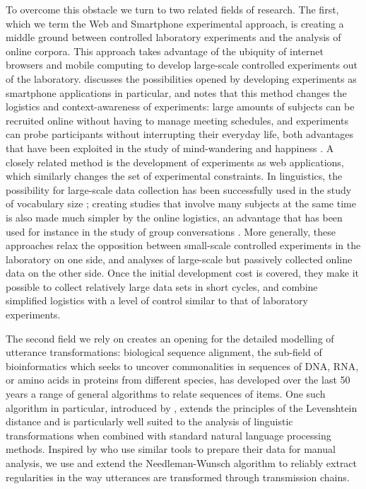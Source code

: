 To overcome this obstacle we turn to two related fields of research. The
first, which we term the Web and Smartphone experimental approach, is
creating a middle ground between controlled laboratory experiments and
the analysis of online corpora. This approach takes advantage of the
ubiquity of internet browsers and mobile computing to develop
large-scale controlled experiments out of the laboratory.
\textcite{miller_smartphone_2012} discusses the possibilities opened by
developing experiments as smartphone applications in particular, and
notes that this method changes the logistics and context-awareness of
experiments: large amounts of subjects can be recruited online without
having to manage meeting schedules, and experiments can probe
participants without interrupting their everyday life, both advantages
that have been exploited in the study of mind-wandering and happiness
\autocites{killingsworth_wandering_2010}{mackerron_happiness_2013}{bastian_language_2017}.
A closely related method is the development of experiments as web
applications, which similarly changes the set of experimental
constraints. In linguistics, the possibility for large-scale data
collection has been successfully used in the study of vocabulary size
\autocites{keuleers_word_2015}{brysbaert_how_2016}; creating studies
that involve many subjects at the same time is also made much simpler by
the online logistics, an advantage that has been used for instance in
the study of group conversations \autocite{niculae_conversational_2016}.
More generally, these approaches relax the opposition between
small-scale controlled experiments in the laboratory on one side, and
analyses of large-scale but passively collected online data on the other
side. Once the initial development cost is covered, they make it
possible to collect relatively large data sets in short cycles, and
combine simplified logistics with a level of control similar to that of
laboratory experiments.

The second field we rely on creates an opening for the detailed
modelling of utterance transformations: biological sequence alignment,
the sub-field of bioinformatics which seeks to uncover commonalities in
sequences of DNA, RNA, or amino acids in proteins from different
species, has developed over the last 50 years a range of general
algorithms to relate sequences of items. One such algorithm in
particular, introduced by \textcite{needleman_general_1970}, extends the
principles of the Levenshtein distance and is particularly well suited
to the analysis of linguistic transformations when combined with
standard natural language processing methods. Inspired by
\textcite{lauf_analyzing_2013} who use similar tools to prepare their
data for manual analysis, we use and extend the Needleman-Wunsch
algorithm to reliably extract regularities in the way utterances are
transformed through transmission chains.
